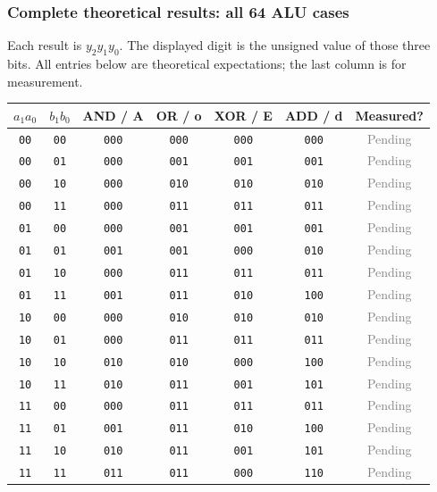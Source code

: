 \documentclass[a4paper,11pt]{article}
\newcommand{\pending}{\textcolor{gray}{Pending}}
\begin{document}
\clearpage\subsubsection*{Complete theoretical results: all 64 ALU cases}
Each result is $y_2y_1y_0$. The displayed digit is the unsigned value of those three
bits. All entries below are theoretical expectations; the last column is for measurement.


\begin{center}\small
\begin{tabular}{ccccccc}
\toprule
$a_1a_0$ & $b_1b_0$ & AND / A & OR / o & XOR / E & ADD / d & Measured?\\\midrule
\texttt{00} & \texttt{00} & \texttt{000} & \texttt{000} & \texttt{000} & \texttt{000} & \pending\\
\texttt{00} & \texttt{01} & \texttt{000} & \texttt{001} & \texttt{001} & \texttt{001} & \pending\\
\texttt{00} & \texttt{10} & \texttt{000} & \texttt{010} & \texttt{010} & \texttt{010} & \pending\\
\texttt{00} & \texttt{11} & \texttt{000} & \texttt{011} & \texttt{011} & \texttt{011} & \pending\\
\texttt{01} & \texttt{00} & \texttt{000} & \texttt{001} & \texttt{001} & \texttt{001} & \pending\\
\texttt{01} & \texttt{01} & \texttt{001} & \texttt{001} & \texttt{000} & \texttt{010} & \pending\\
\texttt{01} & \texttt{10} & \texttt{000} & \texttt{011} & \texttt{011} & \texttt{011} & \pending\\
\texttt{01} & \texttt{11} & \texttt{001} & \texttt{011} & \texttt{010} & \texttt{100} & \pending\\
\texttt{10} & \texttt{00} & \texttt{000} & \texttt{010} & \texttt{010} & \texttt{010} & \pending\\
\texttt{10} & \texttt{01} & \texttt{000} & \texttt{011} & \texttt{011} & \texttt{011} & \pending\\
\texttt{10} & \texttt{10} & \texttt{010} & \texttt{010} & \texttt{000} & \texttt{100} & \pending\\
\texttt{10} & \texttt{11} & \texttt{010} & \texttt{011} & \texttt{001} & \texttt{101} & \pending\\
\texttt{11} & \texttt{00} & \texttt{000} & \texttt{011} & \texttt{011} & \texttt{011} & \pending\\
\texttt{11} & \texttt{01} & \texttt{001} & \texttt{011} & \texttt{010} & \texttt{100} & \pending\\
\texttt{11} & \texttt{10} & \texttt{010} & \texttt{011} & \texttt{001} & \texttt{101} & \pending\\
\texttt{11} & \texttt{11} & \texttt{011} & \texttt{011} & \texttt{000} & \texttt{110} & \pending\\
\bottomrule\end{tabular}\end{center}
\end{document}
